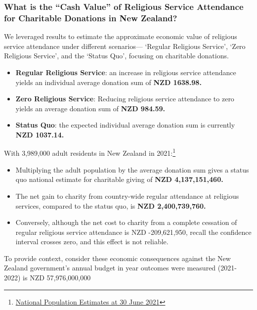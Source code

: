 \documentclass[
  single column]{article}
\providecommand{\tightlist}{%
  \setlength{\itemsep}{0pt}\setlength{\parskip}{0pt}}\usepackage{longtable,booktabs,array}
\begin{document}
\subsubsection{What is the ``Cash Value'' of Religious Service
Attendance for Charitable Donations in New
Zealand?}\label{what-is-the-cash-value-of-religious-service-attendance-for-charitable-donations-in-new-zealand}

We leveraged results to estimate the approximate economic value of
religious service attendance under different scenarios--- `Regular
Religious Service', `Zero Religious Service', and the `Status Quo',
focusing on charitable donations.

\begin{itemize}
\tightlist
\item
  \textbf{Regular Religious Service}: an increase in religious service
  attendance yields an individual average donation sum of \textbf{NZD
  1638.98.}
\item
  \textbf{Zero Religious Service}: Reducing religious service attendance
  to zero yields an average donation sum of \textbf{NZD 984.59.}
\item
  \textbf{Status Quo}: the expected individual average donation sum is
  currently \textbf{NZD 1037.14.}
\end{itemize}

With 3,989,000 adult residents in New Zealand in 2021:\footnote{\href{https://www.stats.govt.nz/information-releases/national-population-estimates-at-30-june-2021}{National
  Population Estimates at 30 June 2021}}

\begin{itemize}
\tightlist
\item
  Multiplying the adult population by the average donation sum gives a
  status quo national estimate for charitable giving of \textbf{NZD
  4,137,151,460.}
\item
  The net gain to charity from country-wide regular attendance at
  religious services, compared to the status quo, is \textbf{NZD
  2,400,739,760.}
\item
  Conversely, although the net cost to charity from a complete cessation
  of regular religious service attendance is NZD -209,621,950, recall
  the confidence interval crosses zero, and this effect is not reliable.
\end{itemize}

To provide context, consider these economic consequences against the New
Zealand government's annual budget in year outcomes were measured
(2021-2022) is NZD 57,976,000,000
\end{document}
